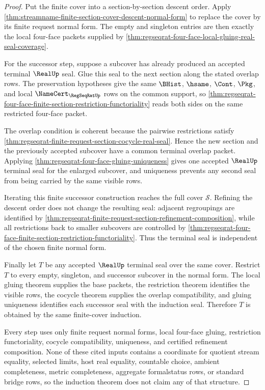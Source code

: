 \begin{proof}
Put the finite cover into a section-by-section descent order. Apply
\autoref{thm:streamname-finite-section-cover-descent-normal-form} to replace
the cover by its finite request normal form. The empty and singleton entries
are then exactly the local four-face packets supplied by
\autoref{thm:regseqrat-four-face-local-gluing-real-seal-coverage}.

For the successor step, suppose a subcover has already produced an accepted
terminal $\RealUp$ seal. Glue this seal to the next section along the stated
overlap rows. The preservation hypotheses give the same $\BHist$, $\hsame$,
$\Cont$, $\Pkg$, and local $\NameCert_{\RegSeqRatUp}$ rows on the common
support, so
\autoref{thm:regseqrat-four-face-finite-section-restriction-functoriality}
reads both sides on the same restricted four-face packet.

The overlap condition is coherent because the pairwise restrictions satisfy
\autoref{thm:regseqrat-finite-request-section-cocycle-real-seal}. Hence the
new section and the previously accepted subcover have a common terminal
overlap packet. Applying
\autoref{thm:regseqrat-four-face-gluing-uniqueness} gives one accepted
$\RealUp$ terminal seal for the enlarged subcover, and uniqueness prevents
any second seal from being carried by the same visible rows.

Iterating this finite successor construction reaches the full cover
$\mathcal{S}$. Refining the descent order does not change the resulting
seal: adjacent regroupings are identified by
\autoref{thm:regseqrat-finite-request-section-refinement-composition}, while
all restrictions back to smaller subcovers are controlled by
\autoref{thm:regseqrat-four-face-finite-section-restriction-functoriality}.
Thus the terminal seal is independent of the chosen finite normal form.

Finally let $T$ be any accepted $\RealUp$ terminal seal over the same cover.
Restrict $T$ to every empty, singleton, and successor subcover in the normal
form. The local gluing theorem supplies the base packets, the restriction
theorem identifies the visible rows, the cocycle theorem supplies the
overlap compatibility, and gluing uniqueness identifies each successor seal
with the induction seal. Therefore $T$ is obtained by the same finite-cover
induction.

Every step uses only finite request normal forms, local four-face gluing,
restriction functoriality, cocycle compatibility, uniqueness, and certified
refinement composition. None of these cited inputs contains a coordinate for
quotient stream equality, selected limits, host real equality, countable
choice, ambient completeness, metric completeness, aggregate formalstatus
rows, or standard bridge rows, so the induction theorem does not claim any
of that structure.
\end{proof}

